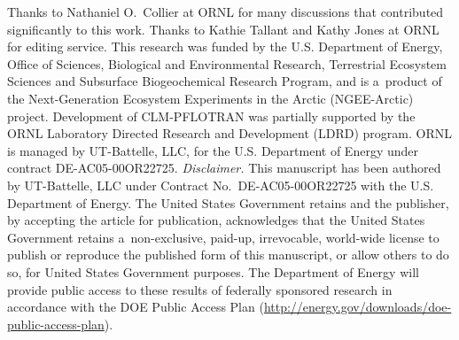 \documentclass[gmdd, online, hvmath]{copernicus}
\begin{document}
\begin{acknowledgements}

      Thanks to Nathaniel O.~Collier at ORNL for many discussions that
      contributed significantly to this work. Thanks to Kathie Tallant and
      Kathy Jones at ORNL for editing service. This research was funded by
      the U.S. Department of Energy, Office of Sciences, Biological and
      Environmental Research, Terrestrial Ecosystem Sciences and Subsurface
      Biogeochemical Research Program, and is a~product of the
      Next-Generation Ecosystem Experiments in the Arctic (NGEE-Arctic)
      project. Development of CLM-PFLOTRAN was partially supported by the
      ORNL Laboratory Directed Research and Development (LDRD) program. ORNL
      is managed by UT-Battelle, LLC, for the U.S. Department of Energy
      under contract DE-AC05-00OR22725.  \hack{\newline}
\hack{\newline}    \hack{\noindent}\textit{Disclaimer.}
 This manuscript has been authored by UT-Battelle, LLC under Contract
      No.~DE-AC05-00OR22725 with the U.S. Department of Energy.  The United
      States Government retains and the publisher, by accepting the article
      for publication, acknowledges that the United States Government
      retains a~non-exclusive, paid-up, irrevocable, world-wide license to
      publish or reproduce the published form of this manuscript, or allow
      others to do so, for United States Government purposes.  The
      Department of Energy will provide public access to these results of
      federally sponsored research in accordance with the DOE Public Access
      Plan (\url{http://energy.gov/downloads/doe-public-access-plan}).
\end{acknowledgements}




%
%
\end{document}
